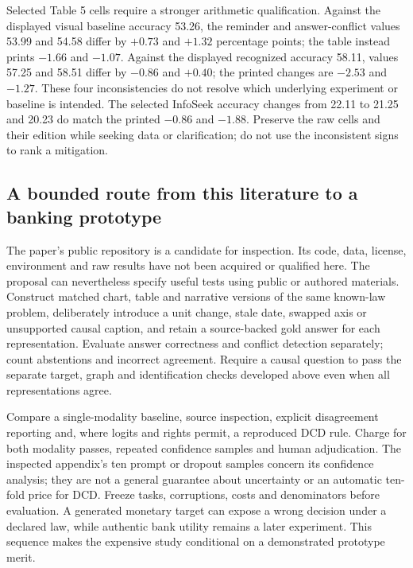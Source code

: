 Selected Table 5 cells require a stronger arithmetic qualification. Against
the displayed visual baseline accuracy 53.26, the reminder and answer-conflict
values 53.99 and 54.58 differ by $+0.73$ and $+1.32$ percentage points;
the table instead prints $-1.66$ and $-1.07$. Against the displayed recognized
accuracy 58.11, values 57.25 and 58.51 differ by $-0.86$ and $+0.40$;
the printed changes are $-2.53$ and $-1.27$. These four inconsistencies do
not resolve which underlying experiment or baseline is intended. The selected
InfoSeek accuracy changes from 22.11 to 21.25 and 20.23 do match the printed
$-0.86$ and $-1.88$. Preserve the raw cells and their edition while seeking
data or clarification; do not use the inconsistent signs to rank a mitigation.
\citep{exec23_cross_modality_conflict,exec23_context_reference}

\subsection{A bounded route from this literature to a banking prototype}
\label{exec23:conflict-prototype}

The paper's public repository is a candidate for inspection. Its code, data,
license, environment and raw results have not been acquired or qualified here.
The proposal can nevertheless specify useful tests using public or authored
materials. Construct matched chart, table and narrative versions of the same
known-law problem, deliberately introduce a unit change, stale date, swapped
axis or unsupported causal caption, and retain a source-backed gold answer
for each representation. Evaluate answer correctness and conflict detection
separately; count abstentions and incorrect agreement. Require a causal
question to pass the separate target, graph and identification checks developed
above even when all representations agree.

Compare a single-modality baseline, source inspection, explicit disagreement
reporting and, where logits and rights permit, a reproduced DCD rule. Charge
for both modality passes, repeated confidence samples and human adjudication.
The inspected appendix's ten prompt or dropout samples concern its confidence
analysis; they are not a general guarantee about uncertainty or an automatic
ten-fold price for DCD. Freeze tasks, corruptions, costs and denominators before
evaluation. A generated monetary target can expose a wrong decision under a
declared law, while authentic bank utility remains a later experiment. This
sequence makes the expensive study conditional on a demonstrated prototype merit.


